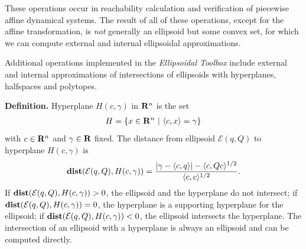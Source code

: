 \documentclass[letterpaper,10pt,english]{sphinxmanual}
\begin{document}
These operations occur in reachability calculation and verification of
piecewise affine dynamical systems. The result of all of these
operations, except for the affine transformation, is \emph{not} generally an
ellipsoid but some convex set, for which we can compute external and
internal ellipsoidal approximations.

Additional operations implemented in the \emph{Ellipsoidal Toolbox} include
external and internal approximations of intersections of ellipsoids with
hyperplanes, halfspaces and polytopes.

\textbf{Definition.} Hyperplane \(H(c,\gamma)\) in
\({\bf R}^n\) is the set
\label{chap_ellcalc:equation-hyperplane}\begin{gather}
\begin{split}H = \{x\in{\bf R}^n ~|~ \langle c, x\rangle = \gamma\}\end{split}\label{chap_ellcalc-hyperplane}
\end{gather}
with \(c\in{\bf R}^n\) and \(\gamma\in{\bf R}\) fixed.
The distance from ellipsoid \({\mathcal E}(q,Q)\) to
hyperplane \(H(c,\gamma)\) is
\label{chap_ellcalc:equation-dist_hp}\begin{gather}
\begin{split}{\bf dist}({\mathcal E}(q,Q),H(c,\gamma)) =
\frac{\left|\gamma-\langle c,q\rangle\right| -
\langle c,Qc\rangle^{1/2}}{\langle c,c\rangle^{1/2}}.\end{split}\label{chap_ellcalc-dist_hp}
\end{gather}
If \({\bf dist}({\mathcal E}(q,Q),H(c,\gamma))>0\), the ellipsoid
and the hyperplane do not intersect; if
\({\bf dist}({\mathcal E}(q,Q),H(c,\gamma))=0\), the hyperplane is a
supporting hyperplane for the ellipsoid; if
\({\bf dist}({\mathcal E}(q,Q),H(c,\gamma))<0\), the ellipsoid
intersects the hyperplane. The intersection of an ellipsoid with a
hyperplane is always an ellipsoid and can be computed directly.
\end{document}
